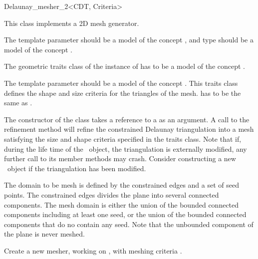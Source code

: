 \begin{ccRefClass}{Delaunay_mesher_2<CDT, Criteria>}

This class implements a 2D mesh generator.

\ccParameters The template parameter  should be a model of the
concept , and type 
should be a model of the concept .

The geometric traits class of the instance of  has to be
a model of the concept .

The template parameter  should be a model of the concept
. This traits class defines the shape and size
criteria for the triangles of the mesh.  has to
be the same as .


The constructor of the class \ccRefName{} takes a reference to a 
as an argument. A call to the refinement method  will
refine the constrained Delaunay triangulation into a mesh satisfying the
size and shape criteria specified in the traits class. Note that if, during
the life time of the \ccRefName\ object, the triangulation is externally
modified, any further call to its member methods may crash. Consider
constructing a new \ccRefName\ object if the triangulation has been
modified.


The domain to be mesh is defined by the constrained edges and a set of seed
points. The constrained edges divides the plane into several connected
components.  The mesh domain is either the union of the bounded connected
components including at least one seed, or the union of the bounded
connected components that do no contain any seed. Note that the unbounded
component of the plane is never meshed.


\ccTypes 
{}

\ccCreation
{}

{Create a new mesher, working on , with meshing criteria
  .}


\end{ccRefClass}
